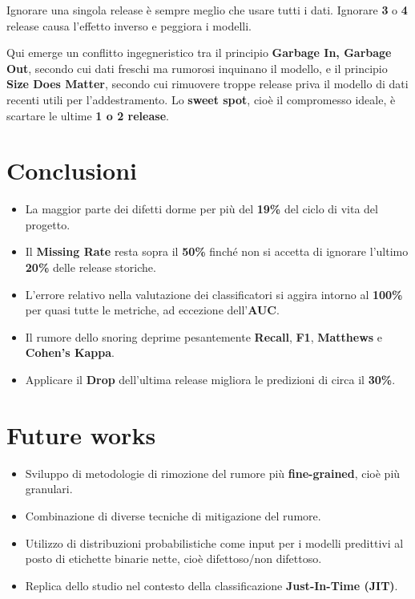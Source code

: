 Ignorare una singola release è sempre meglio che usare tutti i dati. Ignorare \textbf{3} o \textbf{4} release causa l'effetto inverso e peggiora i modelli.

\begin{notaprof}
Qui emerge un conflitto ingegneristico tra il principio \textbf{Garbage In, Garbage Out}, secondo cui dati freschi ma rumorosi inquinano il modello, e il principio \textbf{Size Does Matter}, secondo cui rimuovere troppe release priva il modello di dati recenti utili per l'addestramento. Lo \textbf{sweet spot}, cioè il compromesso ideale, è scartare le ultime \textbf{1 o 2 release}.
\end{notaprof}

\section{Conclusioni}

\begin{itemize}
    \item La maggior parte dei difetti dorme per più del \textbf{19\%} del ciclo di vita del progetto.
    \item Il \textbf{Missing Rate} resta sopra il \textbf{50\%} finché non si accetta di ignorare l'ultimo \textbf{20\%} delle release storiche.
    \item L'errore relativo nella valutazione dei classificatori si aggira intorno al \textbf{100\%} per quasi tutte le metriche, ad eccezione dell'\textbf{AUC}.
    \item Il rumore dello snoring deprime pesantemente \textbf{Recall}, \textbf{F1}, \textbf{Matthews} e \textbf{Cohen's Kappa}.
    \item Applicare il \textbf{Drop} dell'ultima release migliora le predizioni di circa il \textbf{30\%}.
\end{itemize}

\section{Future works}

\begin{itemize}
    \item Sviluppo di metodologie di rimozione del rumore più \textbf{fine-grained}, cioè più granulari.
    \item Combinazione di diverse tecniche di mitigazione del rumore.
    \item Utilizzo di distribuzioni probabilistiche come input per i modelli predittivi al posto di etichette binarie nette, cioè difettoso/non difettoso.
    \item Replica dello studio nel contesto della classificazione \textbf{Just-In-Time (JIT)}.
\end{itemize}